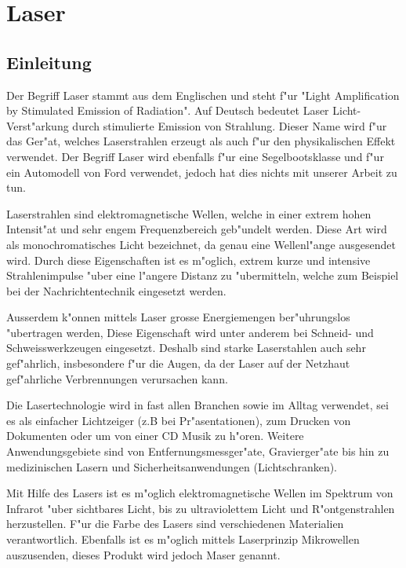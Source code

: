 \chapter{Laser\label{chapter:laser}}
\begin{refsection}


\section{Einleitung}

Der Begriff Laser stammt aus dem Englischen und steht f"ur 
"{}Light Amplification by Stimulated Emission of Radiation"{}.
Auf Deutsch bedeutet Laser Licht-Verst"arkung durch stimulierte Emission 
von Strahlung. Dieser Name wird f"ur das Ger"at, welches Laserstrahlen erzeugt 
als auch f"ur den physikalischen Effekt verwendet. Der Begriff Laser wird
ebenfalls f"ur eine Segelbootsklasse und f"ur ein Automodell von Ford
verwendet,
jedoch hat dies nichts mit unserer Arbeit zu tun.

Laserstrahlen sind elektromagnetische Wellen,
welche in einer extrem hohen Intensit"at und sehr engem
Frequenzbereich geb"undelt werden. Diese Art wird als monochromatisches
Licht bezeichnet, da genau eine Wellenl"ange ausgesendet wird. 
Durch diese Eigenschaften ist es m"oglich, extrem kurze und
intensive Strahlenimpulse "uber eine l"angere Distanz zu "ubermitteln,
welche zum Beispiel bei der Nachrichtentechnik eingesetzt werden.

Ausserdem k"onnen mittels Laser grosse Energiemengen ber"uhrungslos
"ubertragen werden, Diese Eigenschaft wird unter anderem bei Schneid-
und Schweisswerkzeugen eingesetzt. Deshalb sind starke Laserstahlen auch 
sehr gef"ahrlich, insbesondere f"ur die Augen, da der Laser auf der Netzhaut
gef"ahrliche Verbrennungen verursachen kann.

Die Lasertechnologie wird in fast allen Branchen sowie im Alltag verwendet, 
sei es als einfacher Lichtzeiger (z.B bei Pr"asentationen),
zum Drucken von Dokumenten oder um von einer CD Musik zu h"oren. 
Weitere Anwendungsgebiete sind von Entfernungsmessger"ate, 
Gravierger"ate bis hin zu medizinischen Lasern und Sicherheitsanwendungen
(Lichtschranken).

Mit Hilfe des Lasers ist es m"oglich elektromagnetische Wellen im Spektrum
von Infrarot "uber sichtbares Licht, bis zu ultraviolettem Licht und 
R"ontgenstrahlen herzustellen. F"ur die Farbe des Lasers sind 
verschiedenen Materialien verantwortlich. Ebenfalls ist es m"oglich mittels 
Laserprinzip Mikrowellen auszusenden, dieses Produkt wird jedoch Maser genannt.
%


\end{refsection}
